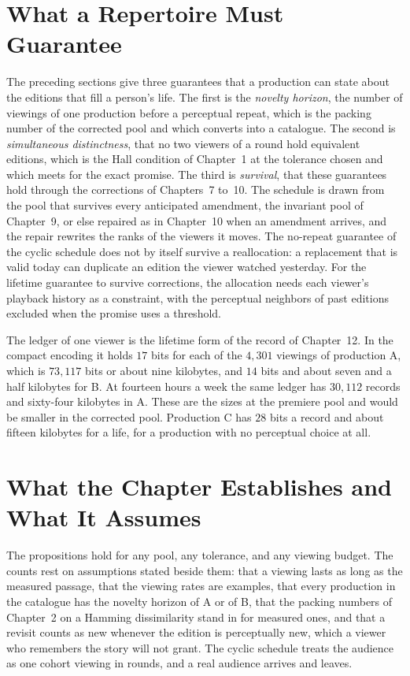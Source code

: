 \documentclass[11pt,twoside,openright]{book}
\theoremstyle{plain}
\theoremstyle{definition}
\theoremstyle{remark}
\begin{document}
\section{What a Repertoire Must Guarantee}\label{sec:guarantee13}

The preceding sections give three guarantees that a production can state about the editions that fill a person's life. The first is the \emph{novelty horizon}, the number of viewings of one production before a perceptual repeat, which is the packing number of the corrected pool and which  converts into a catalogue. The second is \emph{simultaneous distinctness}, that no two viewers of a round hold equivalent editions, which is the Hall condition of Chapter~1 at the tolerance chosen and which  meets for the exact promise. The third is \emph{survival}, that these guarantees hold through the corrections of Chapters~7 to~10. The schedule is drawn from the pool that survives every anticipated amendment, the invariant pool of Chapter~9, or else repaired as in Chapter~10 when an amendment arrives, and the repair rewrites the ranks of the viewers it moves. The no-repeat guarantee of the cyclic schedule does not by itself survive a reallocation: a replacement that is valid today can duplicate an edition the viewer watched yesterday. For the lifetime guarantee to survive corrections, the allocation needs each viewer's playback history as a constraint, with the perceptual neighbors of past editions excluded when the promise uses a threshold.

The ledger of one viewer is the lifetime form of the record of Chapter~12. In the compact encoding it holds $17$ bits for each of the $4{,}301$ viewings of production A, which is $73{,}117$ bits or about nine kilobytes, and $14$ bits and about seven and a half kilobytes for B. At fourteen hours a week the same ledger has $30{,}112$ records and sixty-four kilobytes in A. These are the sizes at the premiere pool and would be smaller in the corrected pool. Production C has $28$ bits a record and about fifteen kilobytes for a life, for a production with no perceptual choice at all.

\section{What the Chapter Establishes and What It Assumes}\label{sec:limits13}

The propositions hold for any pool, any tolerance, and any viewing budget. The counts rest on assumptions stated beside them: that a viewing lasts as long as the measured passage, that the viewing rates are examples, that every production in the catalogue has the novelty horizon of A or of B, that the packing numbers of Chapter~2 on a Hamming dissimilarity stand in for measured ones, and that a revisit counts as new whenever the edition is perceptually new, which a viewer who remembers the story will not grant. The cyclic schedule treats the audience as one cohort viewing in rounds, and a real audience arrives and leaves.
\end{document}
